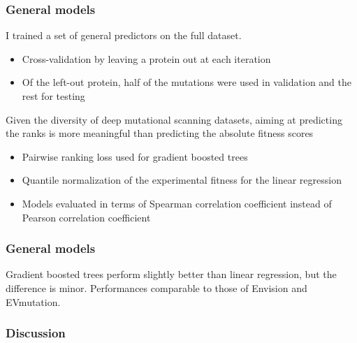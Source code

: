 \documentclass[10pt, british]{beamer}
\begin{document}
\begin{frame}
	\frametitle{General models}
	I trained a set of general predictors on the full dataset.
	\begin{itemize}
		\item Cross-validation by leaving a protein out at each iteration
		\item Of the left-out protein, half of the mutations were used in validation and the rest for testing
	\end{itemize}
	Given the diversity of deep mutational scanning datasets, aiming at predicting the ranks is more meaningful than predicting the absolute fitness scores
	\begin{itemize}
		\item Pairwise ranking loss used for gradient boosted trees
		\item Quantile normalization of the experimental fitness for the linear regression
		\item Models evaluated in terms of Spearman correlation coefficient instead of Pearson correlation coefficient
	\end{itemize}
\end{frame}

\begin{frame}
	\frametitle{General models}
	Gradient boosted trees perform slightly better than linear regression, but the difference is minor.
	Performances comparable to those of Envision and EVmutation.
	\vfill%
	\centering%
	
\end{frame}

\begin{frame}
	\frametitle{Discussion}
	\begin{figure}
	\end{figure}
\end{frame}
\end{document}

